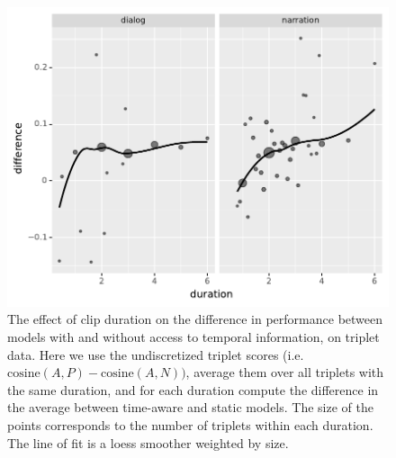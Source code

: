 \begin{figure}[htb]
  \centering
  \includegraphics[width=\columnwidth]{results/duration_effect.pdf}
  \caption{The effect of clip duration on the difference in
    performance between models with and without access to temporal
    information, on triplet data. Here we use the undiscretized
    triplet scores (i.e.\ $\mathrm{cosine}(A, P) - \mathrm{cosine}(A,
    N))$, average them over all triplets with the same duration, and
    for each duration compute the difference in the average between
    time-aware and static models. The size of the points corresponds
    to the number of triplets within each duration. The line of fit is
    a loess smoother weighted by size.}
  \label{fig:duration_effect}
\end{figure}

